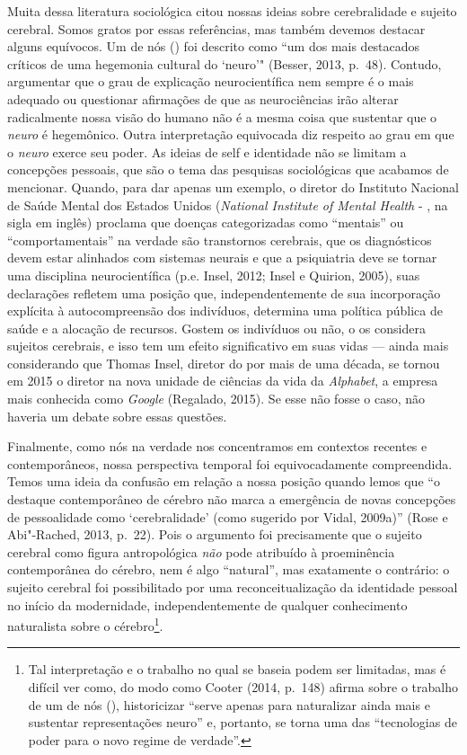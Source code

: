 Muita dessa literatura sociológica citou nossas ideias sobre
cerebralidade e sujeito cerebral. Somos gratos por essas referências,
mas também devemos destacar alguns equívocos. Um de nós () foi
descrito como ``um dos mais destacados críticos de uma hegemonia
cultural do `neuro'" (Besser, 2013, p.~48). Contudo, argumentar que o
grau de explicação neurocientífica nem sempre é o mais adequado ou
questionar afirmações de que as neurociências irão alterar radicalmente
nossa visão do humano não é a mesma coisa que sustentar que o
\emph{neuro} é hegemônico. Outra interpretação equivocada diz respeito
ao grau em que o \emph{neuro} exerce seu poder. As ideias de self e
identidade não se limitam a concepções pessoais, que são o tema das
pesquisas sociológicas que acabamos de mencionar. Quando, para dar
apenas um exemplo, o diretor do Instituto Nacional de Saúde Mental dos
Estados Unidos (\emph{National Institute of Mental Health} - , na
sigla em inglês) proclama que doenças categorizadas como ``mentais'' ou
``comportamentais'' na verdade são transtornos cerebrais, que os
diagnósticos devem estar alinhados com sistemas neurais e que a
psiquiatria deve se tornar uma disciplina neurocientífica (p.e. Insel,
2012; Insel e Quirion, 2005), suas declarações refletem uma posição que,
independentemente de sua incorporação explícita à autocompreensão dos
indivíduos, determina uma política pública de saúde e a alocação de
recursos. Gostem os indivíduos ou não, o  os considera sujeitos
cerebrais, e isso tem um efeito significativo em suas vidas --- ainda
mais considerando que Thomas Insel, diretor do  por mais de uma
década, se tornou em 2015 o diretor na nova unidade de ciências da vida
da \emph{Alphabet}, a empresa mais conhecida como \emph{Google}
(Regalado, 2015). Se esse não fosse o caso, não haveria um debate sobre
essas questões.

Finalmente, como nós na verdade nos concentramos em contextos recentes e
contemporâneos, nossa perspectiva temporal foi equivocadamente
compreendida. Temos uma ideia da confusão em relação a nossa posição
quando lemos que ``o destaque contemporâneo de cérebro não marca a
emergência de novas concepções de pessoalidade como `cerebralidade'
(como sugerido por Vidal, 2009a)'' (Rose e Abi"-Rached, 2013, p.~22). Pois
o argumento foi precisamente que o sujeito cerebral como figura
antropológica \emph{não} pode atribuído à proeminência contemporânea do
cérebro, nem é algo ``natural'', mas exatamente o contrário: o sujeito
cerebral foi possibilitado por uma reconceitualização da identidade
pessoal no início da modernidade, independentemente de qualquer
conhecimento naturalista sobre o cérebro\footnote[5]{Tal interpretação e o trabalho no qual se baseia podem ser
limitadas, mas é difícil ver como, do modo como Cooter (2014, p.~148)
afirma sobre o trabalho de um de nós (), historicizar ``serve apenas
para naturalizar ainda mais e sustentar representações neuro'' e,
portanto, se torna uma das ``tecnologias de poder para o novo regime de
verdade''.}.

